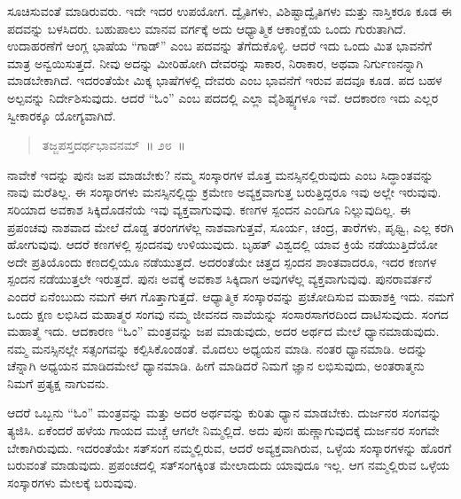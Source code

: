 ಸೂಚಿಸುವಂತೆ ಮಾಡಿರುವರು. ಇದೇ ಇದರ ಉಪಯೋಗ. ದ್ವೈತಿಗಳು, ವಿಶಿಷ್ಟಾದ್ವೈತಿಗಳು ಮತ್ತು ನಾಸ್ತಿಕರೂ ಕೂಡ ಈ ಪದವನ್ನು ಬಳಸಿದರು. ಬಹುಪಾಲು ಮಾನವ ವರ್ಗಕ್ಕೆ ಅದು ಆಧ್ಯಾತ್ಮಿಕ ಆಕಾಂಕ್ಷೆಯ ಒಂದು ಗುರುತಾಗಿದೆ. ಉದಾಹರಣೆಗೆ ಆಂಗ್ಲ ಭಾಷೆಯ “ಗಾಡ್​” ಎಂಬ ಪದವನ್ನು ತೆಗೆದುಕೊಳ್ಳಿ. ಆದರೆ ಇದು ಒಂದು ಮಿತ ಭಾವನೆಗೆ ಮಾತ್ರ ಅನ್ವಯಿಸುತ್ತದೆ. ನೀವು ಅದನ್ನು ಮೀರಿಹೋಗಿ ದೇವರನ್ನು ಸಾಕಾರ, ನಿರಾಕಾರ, ಅಥವಾ ನಿರ್ಗುಣನನ್ನಾಗಿ ಮಾಡಬೇಕಾಗಿದೆ. ಇದರಂತೆಯೇ ಮಿಕ್ಕ ಭಾಷೆಗಳಲ್ಲಿ ದೇವರು ಎಂಬ ಭಾವನೆಗೆ ಇರುವ ಪದವೂ ಕೂಡ. ಪದ ಬಹಳ ಅಲ್ಪವನ್ನು ನಿರ್ದೇಶಿಸುವುದು. ಆದರೆ “ಓಂ” ಎಂಬ ಪದದಲ್ಲಿ ಎಲ್ಲಾ ವೈಶಿಷ್ಟ್ಯಗಳೂ ಇವೆ. ಆದಕಾರಣ ಇದು ಎಲ್ಲರ ಸ್ವೀಕಾರಕ್ಕೂ ಯೋಗ್ಯವಾಗಿದೆ.

\eject

\begin{verse}
ತಜ್ಜಪಸ್ತದರ್ಥಭಾವನಮ್​~॥ ೨೮~॥
\end{verse}

\vspace{-0.3cm}


\vspace{0.1cm}

ನಾವೇಕೆ ಇದನ್ನು ಪುನಃ ಜಪ ಮಾಡಬೇಕು? ನಮ್ಮ ಸಂಸ್ಕಾರಗಳ ಮೊತ್ತ ಮನಸ್ಸಿನಲ್ಲಿರುವುದು ಎಂಬ ಸಿದ್ಧಾಂತವನ್ನು ನಾವು ಮರೆತಿಲ್ಲ. ಈ ಸಂಸ್ಕಾರಗಳು ಮನಸ್ಸಿನಲ್ಲಿದ್ದು ಕ್ರಮೇಣ ಅವ್ಯಕ್ತವಾಗುತ್ತ ಬರುತ್ತಿದ್ದರೂ ಇವು ಅಲ್ಲೇ ಇರುವುವು. ಸರಿಯಾದ ಅವಕಾಶ ಸಿಕ್ಕಿದೊಡನೆಯೆ ಇವು ವ್ಯಕ್ತವಾಗುವುವು. ಕಣಗಳ ಸ್ಪಂದನ ಎಂದಿಗೂ ನಿಲ್ಲುವುದಿಲ್ಲ. ಈ ಪ್ರಪಂಚವು ನಾಶವಾದ ಮೇಲೆ ದೊಡ್ಡ ತರಂಗಗಳೆಲ್ಲ ನಾಶವಾಗುತ್ತವೆ, ಸೂರ್ಯ, ಚಂದ್ರ, ತಾರೆಗಳು, ಪೃಥ್ವಿ, ಎಲ್ಲ ಕರಗಿ ಹೋಗುವುವು. ಆದರೆ ಕಣಗಳಲ್ಲಿ ಸ್ಪಂದನವು ಉಳಿಯುವುದು. ಬೃಹತ್​ ವಿಶ್ವದಲ್ಲಿ ಯಾವ ಕ್ರಿಯೆ ನಡೆಯುತ್ತಿದೆಯೋ ಅದೇ ಪ್ರತಿಯೊಂದು ಕಣದಲ್ಲಿಯೂ ನಡೆಯುತ್ತದೆ. ಅದರಂತೆಯೇ ಚಿತ್ತದ ಸ್ಪಂದನ ಶಾಂತವಾದರೂ, ಇದರ ಕಣಗಳ ಸ್ಪಂದನ ನಡೆಯುತ್ತಲೇ ಇರುತ್ತದೆ. ಪುನಃ ಅವಕ್ಕೆ ಅವಕಾಶ ಸಿಕ್ಕಿದಾಗ ಅವುಗಳೆಲ್ಲ ವ್ಯಕ್ತವಾಗುವುವು. ಪುನರಾವರ್ತನೆ ಎಂದರೆ ಏನೆಂಬುದು ನಮಗೆ ಈಗ ಗೊತ್ತಾಗುತ್ತದೆ. ಆಧ್ಯಾತ್ಮಿಕ ಸಂಸ್ಕಾರವನ್ನು ಪ್ರಚೋದಿಸುವ ಮಹಾಶಕ್ತಿ ಇದು. ನಮಗೆ ಒಂದು ಕ್ಷಣ ಲಭಿಸಿದ ಮಹಾತ್ಮರ ಸಂಗವು ನಮ್ಮ ಜೀವನದ ನಾವೆಯನ್ನು ಸಂಸಾರಸಾಗರದಿಂದ ದಾಟಿಸುವುದು. ಸಂಗದ ಮಹಾತ್ಮೆ ಇದು. ಆದಕಾರಣ “ಓಂ” ಮಂತ್ರವನ್ನು ಜಪ ಮಾಡುವುದು, ಅದರ ಅರ್ಥದ ಮೇಲೆ ಧ್ಯಾನಮಾಡುವುದು. ನಮ್ಮ ಮನಸ್ಸಿನಲ್ಲೇ ಸತ್ಸಂಗವನ್ನು ಕಲ್ಪಿಸಿಕೊಂಡಂತೆ. ಮೊದಲು ಅಧ್ಯಯನ ಮಾಡಿ. ನಂತರ ಧ್ಯಾನಮಾಡಿ. ಅದನ್ನು ಚೆನ್ನಾಗಿ ಅಧ್ಯಯನ ಮಾಡಿದಮೇಲೆ ಧ್ಯಾನಮಾಡಿ. ಹೀಗೆ ಮಾಡಿದರೆ ನಿಮಗೆ ಜ್ಞಾನ ಲಭಿಸುವುದು, ಅಂತರಾತ್ಮನು ನಿಮಗೆ ಪ್ರತ್ಯಕ್ಷ ನಾಗುವನು. 

ಆದರೆ ಒಬ್ಬನು “ಓಂ” ಮಂತ್ರವನ್ನು ಮತ್ತು ಅದರ ಅರ್ಥವನ್ನು ಕುರಿತು ಧ್ಯಾನ ಮಾಡಬೇಕು. ದುರ್ಜನರ ಸಂಗವನ್ನು ತ್ಯಜಿಸಿ. ಏಕೆಂದರೆ ಹಳೆಯ ಗಾಯದ ಮಚ್ಚೆ ಆಗಲೇ ನಿಮ್ಮಲ್ಲಿದೆ. ಅದು ಪುನಃ ಹುಣ್ಣಾಗುವುದಕ್ಕೆ ದುರ್ಜನರ ಸಂಗವೇ ಬೇಕಾಗಿರುವುದು. ಇದರಂತೆಯೇ ಸತ್​ಸಂಗ ನಮ್ಮಲ್ಲಿರುವ, ಆದರೆ ಅವ್ಯಕ್ತವಾಗಿರುವ, ಒಳ್ಳೆಯ ಸಂಸ್ಕಾರಗಳನ್ನು ಹೊರಗೆ ಬರುವಂತೆ ಮಾಡುವುದು. ಪ್ರಪಂಚದಲ್ಲಿ ಸತ್​ಸಂಗಕ್ಕಿಂತ ಮೇಲಾದುದು ಯಾವುದೂ ಇಲ್ಲ. ಆಗ ನಮ್ಮಲ್ಲಿರುವ ಒಳ್ಳೆಯ ಸಂಸ್ಕಾರಗಳು ಮೇಲಕ್ಕೆ ಬರುವುವು. 

